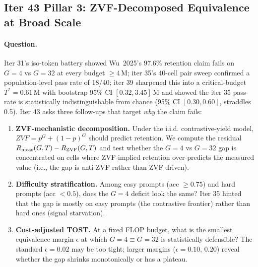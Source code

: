 \subsection{Iter 43 Pillar 3: ZVF-Decomposed Equivalence at Broad Scale}
\label{sec:group-size-iter43}

\paragraph{Question.}
Iter 31's iso-token battery showed Wu~2025's 97.6\% retention claim
fails on $G{=}4$ vs $G{=}32$ at every budget $\geq 4$\,M; iter 35's
40-cell pair sweep confirmed a population-level pass rate of 18/40;
iter 39 sharpened this into a critical-budget $T^*{=}0.61$\,M with
bootstrap 95\% CI $[0.32, 3.45]$\,M and showed the iter 35 pass-rate
is statistically indistinguishable from chance (95\% CI $[0.30,
0.60]$, straddles 0.5). Iter 43 asks three follow-ups that target
\emph{why} the claim fails:
\begin{enumerate}
  \item \textbf{ZVF-mechanistic decomposition.} Under the i.i.d.
        contrastive-yield model, $ZVF = p^G + (1-p)^G$ should predict
        retention. We compute the residual
        $R_{\rm meas}(G,T) - R_{\rm ZVF}(G,T)$ and test whether the
        $G{=}4$ vs $G{=}32$ gap is concentrated on cells where
        ZVF-implied retention over-predicts the measured value (i.e.,
        the gap is anti-ZVF rather than ZVF-driven).
  \item \textbf{Difficulty stratification.} Among easy prompts (acc
        $\geq 0.75$) and hard prompts (acc $< 0.5$), does the
        $G{=}4$ deficit look the same? Iter 35 hinted that the gap is
        mostly on easy prompts (the contrastive frontier) rather than
        hard ones (signal starvation).
  \item \textbf{Cost-adjusted TOST.} At a fixed FLOP budget, what is
        the smallest equivalence margin $\epsilon$ at which
        $G{=}4 \equiv G{=}32$ is statistically defensible? The
        standard $\epsilon{=}0.02$ may be too tight; larger margins
        ($\epsilon{=}0.10$, $0.20$) reveal whether the gap shrinks
        monotonically or has a plateau.
\end{enumerate}

